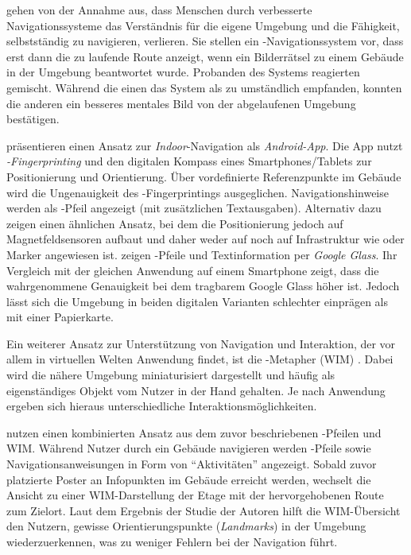 \textcite{Wen2014} gehen von der Annahme aus, dass Menschen durch verbesserte Navigationssysteme das Verständnis für die eigene Umgebung und die Fähigkeit, selbstständig zu navigieren, verlieren.
Sie stellen ein -Navigationssystem vor, dass erst dann die zu laufende Route anzeigt, wenn ein Bilderrätsel zu einem Gebäude in der Umgebung beantwortet wurde.
Probanden des Systems reagierten gemischt.
Während die einen das System als zu umständlich empfanden, konnten die anderen ein besseres mentales Bild von der abgelaufenen Umgebung bestätigen.

\textcite{Alnabhan2014} präsentieren einen Ansatz zur \emph{Indoor}-Navigation als \emph{Android-App}.
Die App nutzt \emph{-Fingerprinting} und den digitalen Kompass eines Smartphones/Tablets zur Positionierung und Orientierung.
Über vordefinierte Referenzpunkte im Gebäude wird die Ungenauigkeit des -Fingerprintings ausgeglichen.
Navigationshinweise werden als -Pfeil angezeigt (mit zusätzlichen Textausgaben).
Alternativ dazu zeigen \textcite{Liu2016} einen ähnlichen Ansatz, bei dem die Positionierung jedoch auf Magnetfeldsensoren aufbaut und daher weder auf  noch auf Infrastruktur wie  oder Marker angewiesen ist.
\textcite{Rehman2017} zeigen -Pfeile und Textinformation per \emph{Google Glass}.
Ihr Vergleich mit der gleichen Anwendung auf einem Smartphone zeigt, dass die wahrgenommene Genauigkeit bei dem tragbarem Google Glass höher ist. Jedoch lässt sich die Umgebung in beiden digitalen Varianten schlechter einprägen als mit einer Papierkarte.

Ein weiterer Ansatz zur Unterstützung von Navigation und Interaktion, der vor allem in virtuellen Welten Anwendung findet, ist die \emph{}-Metapher (WIM) \parencite{Stoakley1995}.
Dabei wird die nähere Umgebung miniaturisiert dargestellt und häufig als eigenständiges Objekt vom Nutzer in der Hand gehalten.
Je nach Anwendung ergeben sich hieraus unterschiedliche Interaktionsmöglichkeiten.

\textcites{Mulloni2011a}{Mulloni2012} nutzen einen kombinierten Ansatz aus dem zuvor beschriebenen -Pfeilen und WIM.
Während Nutzer durch ein Gebäude navigieren werden -Pfeile sowie Navigationsanweisungen in Form von \enquote{Aktivitäten} angezeigt.
Sobald zuvor platzierte Poster an Infopunkten im Gebäude erreicht werden, wechselt die Ansicht zu einer WIM-Darstellung der Etage mit der hervorgehobenen Route zum Zielort.
Laut dem Ergebnis der Studie der Autoren hilft die WIM-Übersicht den Nutzern, gewisse Orientierungspunkte (\emph{Landmarks}) in der Umgebung wiederzuerkennen, was zu weniger Fehlern bei der Navigation führt.

